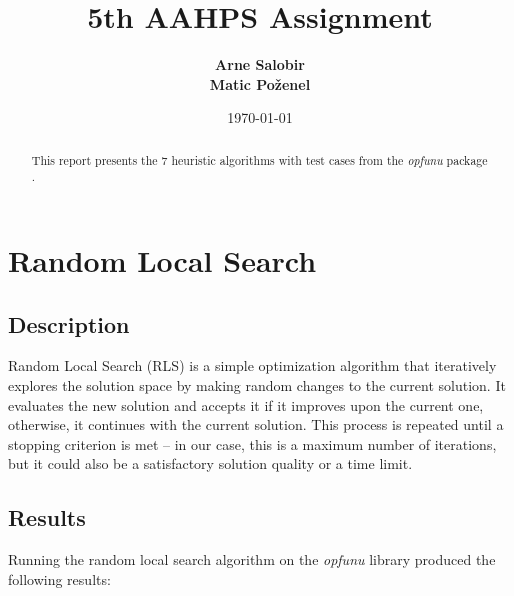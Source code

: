 \documentclass{article}
\title{\LARGE \textbf{5th AAHPS Assignment}}
\author{
  \textbf{Arne Salobir} \\
  \textbf{Matic Poženel} \\
}
\date{\today}
\begin{document}
\maketitle

\begin{abstract}
  This report presents the 7 heuristic algorithms with test cases
  from the \textit{opfunu} package \cite{opfunu}.
\end{abstract}

\section{Random Local Search}

\subsection{Description}

Random Local Search (RLS) is a simple optimization algorithm that
iteratively explores the solution space by making random changes to
the current solution. It evaluates the new solution and accepts it if
it improves upon the current one, otherwise, it continues with the
current solution. This process is repeated until a stopping criterion
is met -- in our case, this is a maximum number of iterations, but it
could also be a satisfactory solution quality or a time limit.

\subsection{Results}

Running the random local search algorithm on the \textit{opfunu} library
produced the following results:
\end{document}
